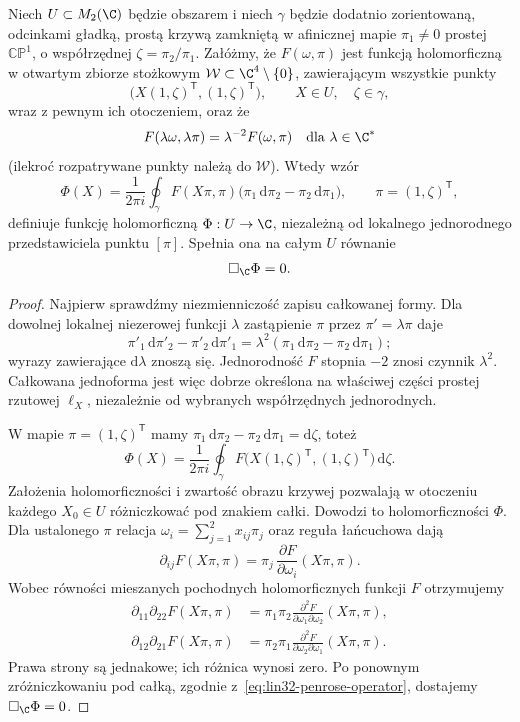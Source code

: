 \begin{twierdzenie}
\label{thm:lin32-penrose-fala}
Niech $U\subset M_2(\C)$ będzie obszarem
i niech $\gamma$ będzie dodatnio zorientowaną,
odcinkami gładką, prostą krzywą zamkniętą
w afinicznej mapie $\pi_1\ne0$ prostej
$\mathbb{CP}^1$, o współrzędnej
$\zeta=\pi_2/\pi_1$.
Załóżmy, że $F(\omega,\pi)$ jest funkcją
holomorficzną w otwartym zbiorze stożkowym
$\mathcal W\subset\C^4\setminus\{0\}$,
zawierającym wszystkie punkty
\[
 \bigl(X(1,\zeta)^{\mathsf T},(1,\zeta)^{\mathsf T}\bigr),
 \qquad X\in U,\quad\zeta\in\gamma,
\]
wraz z pewnym ich otoczeniem, oraz że
\[
 F(\lambda\omega,\lambda\pi)
  =\lambda^{-2}F(\omega,\pi)
 \quad\text{dla }\lambda\in\C^\ast
\]
(ilekroć rozpatrywane punkty należą do $\mathcal W$).
Wtedy wzór
\begin{equation}\label{eq:lin32-penrose-transform}
 \Phi(X)=\frac{1}{2\pi i}
  \oint_\gamma F(X\pi,\pi)
       \bigl(\pi_1\,\mathrm d\pi_2
                    -\pi_2\,\mathrm d\pi_1\bigr),
 \qquad \pi=(1,\zeta)^{\mathsf T},
\end{equation}
definiuje funkcję holomorficzną $\Phi:U\to\C$,
niezależną od lokalnego jednorodnego
przedstawiciela punktu $[\pi]$.
Spełnia ona na całym $U$ równanie
\[
 \Box_{\C}\Phi=0.
\]
\end{twierdzenie}
\begin{proof}
Najpierw sprawdźmy niezmienniczość zapisu
całkowanej formy. Dla dowolnej lokalnej
niezerowej funkcji $\lambda$ zastąpienie
$\pi$ przez $\pi'=\lambda\pi$ daje
\[
 \pi'_1\,\mathrm d\pi'_2
 -\pi'_2\,\mathrm d\pi'_1
 =\lambda^2
  (\pi_1\,\mathrm d\pi_2-\pi_2\,\mathrm d\pi_1);
\]
wyrazy zawierające $\mathrm d\lambda$ znoszą się.
Jednorodność $F$ stopnia $-2$ znosi czynnik
$\lambda^2$. Całkowana jednoforma jest więc
dobrze określona na właściwej części prostej
rzutowej $\ell_X$, niezależnie od
wybranych współrzędnych jednorodnych.

W mapie $\pi=(1,\zeta)^{\mathsf T}$ mamy
$\pi_1\,\mathrm d\pi_2-\pi_2\,\mathrm d\pi_1
=\mathrm d\zeta$, toteż
\[
 \Phi(X)=\frac{1}{2\pi i}
  \oint_\gamma
    F\bigl(X(1,\zeta)^{\mathsf T},
           (1,\zeta)^{\mathsf T}\bigr)
  \,\mathrm d\zeta.
\]
Założenia holomorficzności i zwartość obrazu
krzywej pozwalają w otoczeniu każdego
$X_0\in U$ różniczkować pod znakiem całki.
Dowodzi to holomorficzności $\Phi$.
Dla ustalonego $\pi$ relacja
$\omega_i=\sum_{j=1}^2x_{ij}\pi_j$
oraz reguła łańcuchowa dają
\[
 \partial_{ij}F(X\pi,\pi)
   =\pi_j\,
     \frac{\partial F}{\partial\omega_i}(X\pi,\pi).
\]
Wobec równości mieszanych pochodnych holomorficznych
funkcji $F$ otrzymujemy
\[
 \begin{aligned}
 \partial_{11}\partial_{22}F(X\pi,\pi)
   &=\pi_1\pi_2
     \frac{\partial^2F}
      {\partial\omega_1\partial\omega_2}(X\pi,\pi),\\
 \partial_{12}\partial_{21}F(X\pi,\pi)
   &=\pi_2\pi_1
     \frac{\partial^2F}
      {\partial\omega_2\partial\omega_1}(X\pi,\pi).
 \end{aligned}
\]
Prawa strony są jednakowe; ich różnica wynosi zero.
Po ponownym zróżniczkowaniu pod całką,
zgodnie z~\eqref{eq:lin32-penrose-operator},
dostajemy $\Box_{\C}\Phi=0$.
\end{proof}

